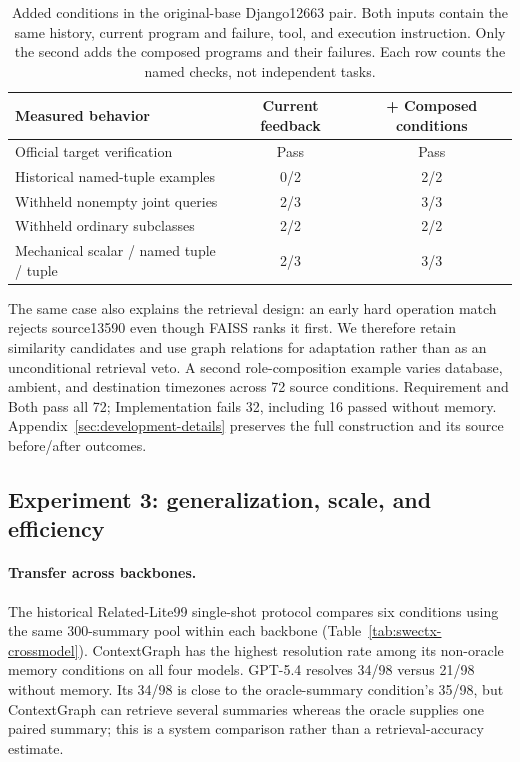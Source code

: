 \begin{table}[!htbp]
\centering
\caption{Added conditions in the original-base Django12663 pair. Both inputs
contain the same history, current program and failure, tool, and execution
instruction. Only the second adds the composed programs and their failures.
Each row counts the named checks, not independent tasks.}
\label{tab:composedconditions}
\begin{tabular}{lcc}
\toprule
Measured behavior & Current feedback & + Composed conditions \\
\midrule
Official target verification & Pass & Pass \\
Historical named-tuple examples & 0/2 & 2/2 \\
Withheld nonempty joint queries & 2/3 & 3/3 \\
Withheld ordinary subclasses & 2/2 & 2/2 \\
Mechanical scalar / named tuple / tuple & 2/3 & 3/3 \\
\bottomrule
\end{tabular}
\end{table}

The same case also explains the retrieval design: an early hard operation
match rejects source13590 even though FAISS ranks it first. We therefore retain
similarity candidates and use graph relations for adaptation rather than as
an unconditional retrieval veto. A second role-composition example varies
database, ambient, and destination timezones across 72 source conditions.
Requirement and Both pass all 72; Implementation fails 32, including 16
passed without memory. Appendix~\ref{sec:development-details} preserves the
full construction and its source before/after outcomes.

\subsection{Experiment 3: generalization, scale, and efficiency}
\label{sec:recorded-generalization}
\paragraph{Transfer across backbones.}
The historical Related-Lite99 single-shot protocol compares six conditions
using the same 300-summary pool within each backbone
(Table~\ref{tab:swectx-crossmodel}). ContextGraph has the highest resolution
rate among its non-oracle memory conditions on all four models. GPT-5.4
resolves 34/98 versus 21/98 without memory. Its 34/98 is close to the
oracle-summary condition's 35/98, but ContextGraph can retrieve several
summaries whereas the oracle supplies one paired summary; this is a system
comparison rather than a retrieval-accuracy estimate.

